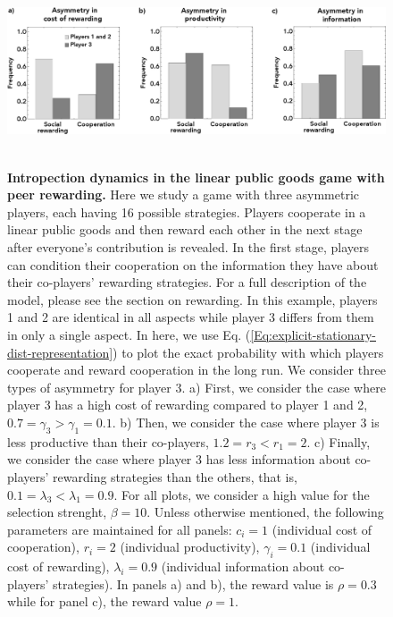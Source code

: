 \documentclass[11pt]{article}
\theoremstyle{plainCl1}
\theoremstyle{plainCl2}
\begin{document}
\clearpage
\begin{figure}
\centering
\includegraphics[width =  \textwidth]{figures/Fig4.eps}~\\[0.4cm]
\caption{\onehalfspacing
\textbf{Intropection dynamics in the linear public goods game with peer rewarding.} Here we study a game with three asymmetric players, each having 16 possible strategies. Players cooperate in a linear public goods and then reward each other in the next stage after everyone's contribution is revealed. In the first stage, players can condition their cooperation on the information they have about their co-players' rewarding strategies. For a full description of the model, please see the section on rewarding. In this example, players 1 and 2 are identical in all aspects while player 3 differs from them in only a single aspect. In here, we use Eq. (\ref{Eq:explicit-stationary-dist-representation}) to plot the exact probability with which players cooperate and reward cooperation in the long run. We consider three types of asymmetry for player 3. a) First, we consider the case where player 3 has a high cost of rewarding compared to player 1 and 2, $0.7 = \gamma_3 > \gamma_1 = 0.1$. b) Then, we consider the case where player 3 is less productive than their co-players, $1.2 = r_3 < r_1 = 2$. c) Finally, we consider the case where player 3 has less information about co-players' rewarding strategies than the others, that is, $0.1 = \lambda_3 < \lambda_1 = 0.9$. For all plots, we consider a high value for the selection strenght, $\beta = 10$. Unless otherwise mentioned, the following parameters are maintained for all panels: $c_i = 1$ (individual cost of cooperation), $r_i = 2$ (individual productivity), $\gamma_i = 0.1$ (individual cost of rewarding), $\lambda_i = 0.9$ (individual information about co-players' strategies). In panels a) and b), the reward value is $\rho=0.3$ while for panel c), the reward value $\rho = 1$.}
\label{Fig:SocialRewarding}
\end{figure}

\clearpage

\newpage

\end{document}
